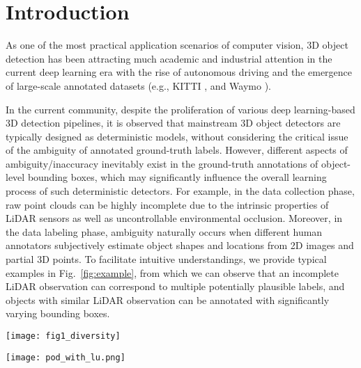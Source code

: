 \documentclass[twocolumn]{svjour3}
\begin{document}
\section{Introduction} \label{sec1}


As one of the most practical application scenarios of computer vision, 3D object detection has been attracting much academic and industrial attention in the current deep learning era with the rise of autonomous driving and the emergence of large-scale annotated datasets (e.g., KITTI \citep{Geiger_KITTI}, and Waymo \citep{Sun_2020_CVPR}).

In the current community, despite the proliferation of various deep learning-based 3D detection pipelines, it is observed that mainstream 3D object detectors are typically designed as deterministic models, without considering the critical issue of the ambiguity of annotated ground-truth labels. However, different aspects of ambiguity/inaccuracy inevitably exist in the ground-truth annotations of object-level bounding boxes, which may significantly influence the overall learning process of such deterministic detectors. For example, in the data collection phase, raw point clouds can be highly incomplete due to the intrinsic properties of LiDAR sensors as well as uncontrollable environmental occlusion. Moreover, in the data labeling phase, ambiguity naturally occurs when different human annotators subjectively estimate object shapes and locations from 2D images and partial 3D points. To facilitate intuitive understandings, we provide typical examples in Fig.~\ref{fig:example}, from which we can observe that an incomplete LiDAR observation can correspond to multiple potentially plausible labels, and objects with similar LiDAR observation can be annotated with significantly varying bounding boxes.


\begin{figure*}[htp]
\centering
\texttt{[image: fig1\_diversity]}
\caption{(a) Given an object with an incomplete LiDAR observation, there may exist multiple potentially plausible ground-truth bounding boxes with varying sizes and shapes. (b) Ambiguity and inaccuracy can be inevitable in the labeling process when annotations are derived from 2D images and partial points. In the given cases, similar point clouds of the \textit{car} category with only the \textit{rear} part can be annotated with different ground-truth boxes of varying lengths.}
\label{fig:example}
\end{figure*}


\begin{figure*}
\centering
\texttt{[image: pod\_with\_lu.png]}
\caption{Illustration of two different learning paradigms of probabilistic object detectors. (a) Methods that adopt probabilistic modeling in the detection head but essentially still ignore the issue of ambiguity in ground-truth bounding boxes. (b) Methods that explicitly estimate ground-truth bounding box distributions to be used as more reliable supervision signals.}
\label{fig:pod_with_lu}
\end{figure*}
\end{document}
